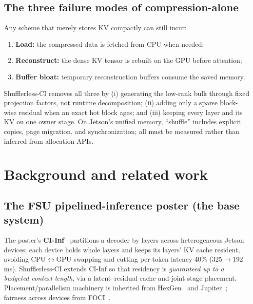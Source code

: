 \documentclass[11pt]{article}
\newcommand{\term}[1]{\textbf{\color{accent!85!black}#1}}
\begin{document}
\subsection{The three failure modes of compression-alone}
Any scheme that merely stores KV compactly can still incur:
\begin{enumerate}[leftmargin=1.5em,itemsep=1pt]
\item \term{Load:} the compressed data is fetched from CPU when needed;
\item \term{Reconstruct:} the dense KV tensor is rebuilt on the GPU before attention;
\item \term{Buffer bloat:} temporary reconstruction buffers consume the saved memory.
\end{enumerate}
Shufflerless-CI removes all three by (i) generating the low-rank bulk through fixed projection
factors, not runtime decomposition; (ii) adding only a sparse block-wise residual when an exact
hot block ages; and (iii) keeping every layer and its KV on one owner stage. On Jetson's unified
memory, ``shuffle'' includes explicit copies, page migration, and synchronization; all must be
measured rather than inferred from allocation APIs.

\section{Background and related work}

\subsection{The FSU pipelined-inference poster (the base system)}
The poster's \term{CI-Inf}~\cite{poster} partitions a decoder by layers across heterogeneous
Jetson devices; each device holds whole layers and keeps its layers' KV cache resident,
avoiding CPU$\leftrightarrow$GPU swapping and cutting per-token latency 40\%
(325$\to$192\,ms). Shufflerless-CI extends CI-Inf so that residency is \emph{guaranteed up to a
budgeted context length}, via a latent--residual cache and joint stage placement.
Placement/parallelism machinery is inherited from HexGen~\cite{hexgen} and
Jupiter~\cite{jupiter}; fairness across devices from FOCI~\cite{foci}.
\end{document}
